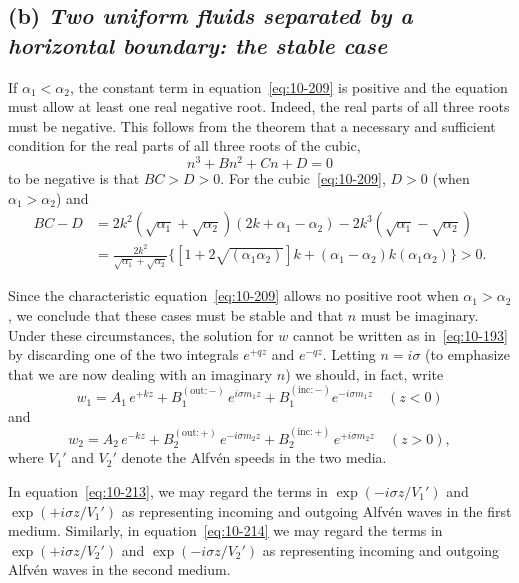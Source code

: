 \subsection*{(b) \textit{Two uniform fluids separated by a horizontal boundary: the stable case}}

If $\alpha_1 < \alpha_2$, the constant term in equation~\eqref{eq:10-209} is positive and the equation must allow at least one real negative root. Indeed, the real parts of all three roots must be negative. This follows from the theorem that a necessary and sufficient condition for the real parts of all three roots of the cubic,
\begin{equation}
\label{eq:10-211}
n^3+Bn^2+Cn+D = 0
\end{equation}
to be negative is that $BC > D > 0$. For the cubic~\eqref{eq:10-209}, $D > 0$ (when $\alpha_1 > \alpha_2$) and
\begin{align}
\label{eq:10-212}
BC-D &= 2k^2(\sqrt{\alpha_1}+\sqrt{\alpha_2})(2k+\alpha_1-\alpha_2)-2k^3(\sqrt{\alpha_1}-\sqrt{\alpha_2}) \nonumber\\
&= \frac{2k^2}{\sqrt{\alpha_1}+\sqrt{\alpha_2}}\{[1+2\sqrt{(\alpha_1\alpha_2)}]k+(\alpha_1-\alpha_2)k(\alpha_1\alpha_2)\} > 0.
\end{align}

Since the characteristic equation~\eqref{eq:10-209} allows no positive root when $\alpha_1 > \alpha_2$, we conclude that these cases must be stable and that $n$ must be imaginary. Under these circumstances, the solution for $w$ cannot be written as in~\eqref{eq:10-193} by discarding one of the two integrals $e^{+qz}$ and $e^{-qz}$. Letting $n = i\sigma$ (to emphasize that we are now dealing with an imaginary $n$) we should, in fact, write
\begin{equation}
\label{eq:10-213}
w_1 = A_1\,e^{+kz}+B_1^{(\mathrm{out}:-)}\,e^{i\sigma m_1 z}+B_1^{(\mathrm{inc}:-)}e^{-i\sigma m_1 z} \quad (z < 0)
\end{equation}
and
\begin{equation}
\label{eq:10-214}
w_2 = A_2\,e^{-kz}+B_2^{(\mathrm{out}:+)}\,e^{-i\sigma m_2 z}+B_2^{(\mathrm{inc}:+)}\,e^{+i\sigma m_2 z} \quad (z > 0),
\end{equation}
where $V_1'$ and $V_2'$ denote the Alfv\'en speeds in the two media.

In equation~\eqref{eq:10-213}, we may regard the terms in $\exp(-i\sigma z/V_1')$ and $\exp(+i\sigma z/V_1')$ as representing incoming and outgoing Alfv\'en waves in the first medium. Similarly, in equation~\eqref{eq:10-214} we may regard the terms in $\exp(+i\sigma z/V_2')$ and $\exp(-i\sigma z/V_2')$ as representing incoming and outgoing Alfv\'en waves in the second medium.

